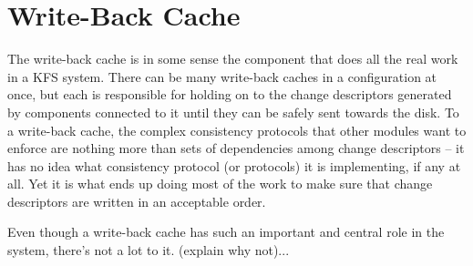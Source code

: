 \section{Write-Back Cache}

The write-back cache is in some sense the component that does all the real work
in a KFS system. There can be many write-back caches in a configuration at once,
but each is responsible for holding on to the change descriptors generated by
components connected to it until they can be safely sent towards the disk. To a
write-back cache, the complex consistency protocols that other modules want to
enforce are nothing more than sets of dependencies among change descriptors --
it has no idea what consistency protocol (or protocols) it is implementing, if
any at all. Yet it is what ends up doing most of the work to make sure that
change descriptors are written in an acceptable order.

Even though a write-back cache has such an important and central role in the
system, there's not a lot to it. (explain why not)...

